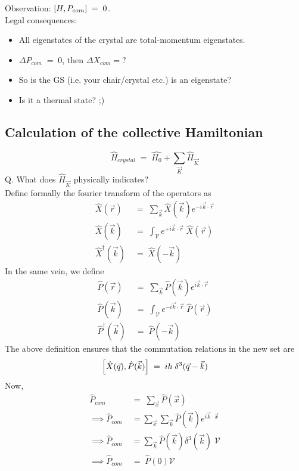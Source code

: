 \documentclass[12pt]{article}
\begin{document}
Observation: $\comm{H}{P_{com}}\;=\;0$.\\

Legal consequences:
\begin{itemize}
    \item All eigenstates of the crystal are total-momentum eigenstates.
    \item $\Delta P_{com}\;=\;0$, then $\Delta X_{com}=?$
    \item So is the GS (i.e. your chair/crystal etc.) is an eigenstate?
    \item Is it a thermal state? ;)
\end{itemize}
\newpage
\subsection{Calculation of the collective Hamiltonian}
$$  \hat{H}_{crystal}\;=\;\hat{H_0} + \sum_{\Vec{K}}\hat{H}_{\Vec{K}}$$
Q. What does $\hat{H}_{\Vec{K}}$ physically indicates?\\
Define formally the fourier transform of the operators as
\begin{align}
    \hat{X}(\Vec{r})\;&=\;\sum_{\Vec{k}} \hat{X}(\Vec{k}) e^{-i\Vec{k}\cdot\Vec{r}}\\
    \hat{X}(\Vec{k})\;&=\;\int_{\mathcal{V}} e^{+i\Vec{k}\cdot\Vec{r}}\;\hat{X}(\Vec{r})\\
    \hat{X}^{\dagger}(\Vec{k})\;&=\; \hat{X}(-\Vec{k})
\end{align}
In the same vein, we define
\begin{align}
 \hat{P}(\Vec{r})\;&=\;\sum_{\Vec{k}} \hat{P}(\Vec{k}) e^{i\Vec{k}\cdot\Vec{r}}\\
    \hat{P}(\Vec{k})\;&=\;\int_{\mathcal{V}} e^{-i\Vec{k}\cdot\Vec{r}}\;\hat{P}(\Vec{r})\\
    \hat{P}^{\dagger}(\Vec{k})\;&=\; \hat{P}(-\Vec{k})
\end{align}
The above definition ensures that the commutation relations in the new set are
\begin{equation}
    \comm{\hat{X}(\Vec{q})}{\hat{P}(\Vec{k})}\;=\;ih\;\delta^3(\Vec{q}-\Vec{k})
\end{equation}
Now,
\begin{align}
    \hat{P}_{com}\;&=\;\sum_{\Vec{x}} \hat{P}(\Vec{x})\\
    \implies \hat{P}_{com}\;&=\sum_{\Vec{x}}\sum_{\Vec{k}} \hat{P}(\Vec{k}) e^{i\Vec{k}\cdot\Vec{x}}\\
    \implies \hat{P}_{com}\;&=\sum_{\Vec{k}} \hat{P}(\Vec{k}) \delta^{3}(\Vec{k})\;\mathcal{V}\\
    \implies \hat{P}_{com}\;&=\;\hat{P}(0)\mathcal{V}
\end{align}
\end{document}
